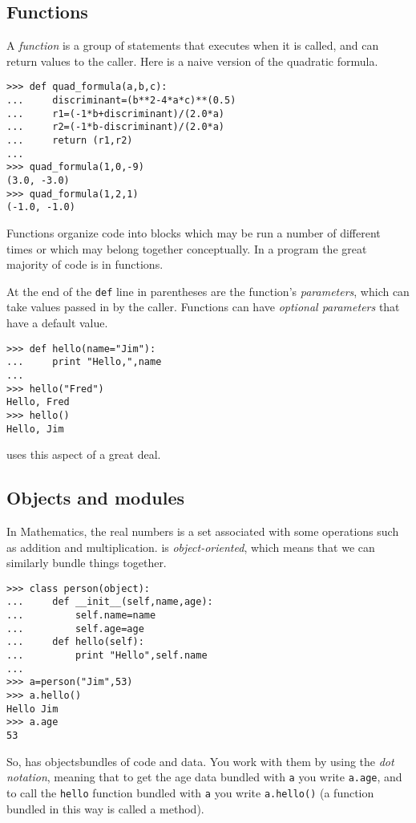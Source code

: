 \subsection{Functions}
A \textit{function} is a group of statements that executes when it is called,
and can return values to the caller.
Here is a naive version of the quadratic formula.
\begin{lstlisting}[style=python]
>>> def quad_formula(a,b,c):
...     discriminant=(b**2-4*a*c)**(0.5)
...     r1=(-1*b+discriminant)/(2.0*a)
...     r2=(-1*b-discriminant)/(2.0*a)
...     return (r1,r2)
... 
>>> quad_formula(1,0,-9)
(3.0, -3.0)
>>> quad_formula(1,2,1)
(-1.0, -1.0)
\end{lstlisting}
Functions organize code into blocks which may be 
run a number of different times or which may belong together conceptually. 
In a \python{} program the great majority of code is in functions. 

At the end of the \lstinline[style=inline]!def! line in parentheses are
the function's \textit{parameters}, which can take values 
passed in by the caller.
Functions can have \textit{optional parameters} that have a default value.
\begin{lstlisting}[style=python]
>>> def hello(name="Jim"):
...     print "Hello,",name
... 
>>> hello("Fred")
Hello, Fred
>>> hello()
Hello, Jim  
\end{lstlisting}
\sage{} uses this aspect of \python{} a great deal.


\subsection{Objects and modules}
In Mathematics, the real numbers is a set associated with some operations
such as addition and multiplication.
\python{} is \textit{object-oriented}, which means that we can similarly bundle
things together.
\begin{lstlisting}[style=python]
>>> class person(object):
...     def __init__(self,name,age):
...         self.name=name
...         self.age=age
...     def hello(self):
...         print "Hello",self.name
... 
>>> a=person("Jim",53)
>>> a.hello()
Hello Jim
>>> a.age
53  
\end{lstlisting}
So, \python{} has 
objects\Dash bundles of code and data.
You work with them by using the \textit{dot notation}, meaning that
to get the age data bundled with \lstinline[style=inline]!a!
you write \lstinline[style=inline]!a.age!, and to 
call the \lstinline[style=inline]!hello! function bundled
with \lstinline[style=inline]!a! you write
\lstinline[style=inline]!a.hello()! 
(a function bundled in this way is called a method).

